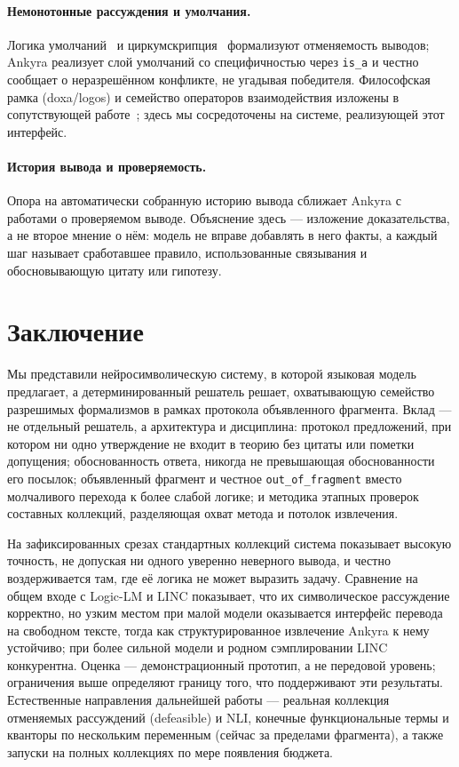 \documentclass[11pt,a4paper]{article}
\begin{document}
\paragraph{Немонотонные рассуждения и умолчания.} Логика умолчаний~\cite{reiter} и
циркумскрипция~\cite{mccarthy} формализуют отменяемость выводов; Ankyra реализует слой умолчаний со
специфичностью через \texttt{is\_a} и честно сообщает о неразрешённом конфликте, не угадывая победителя.
Философская рамка (doxa/logos) и семейство операторов взаимодействия изложены в сопутствующей работе~\cite{doxa};
здесь мы сосредоточены на системе, реализующей этот интерфейс.

\paragraph{История вывода и проверяемость.} Опора на автоматически собранную историю вывода сближает
Ankyra с работами о проверяемом выводе. Объяснение здесь — изложение доказательства, а не второе мнение
о нём: модель не вправе добавлять в него факты, а каждый шаг называет сработавшее правило, использованные
связывания и обосновывающую цитату или гипотезу.

\section{Заключение}

Мы представили нейросимволическую систему, в которой языковая модель предлагает, а детерминированный
решатель решает, охватывающую семейство разрешимых формализмов в рамках протокола объявленного фрагмента.
Вклад — не отдельный решатель, а архитектура и дисциплина: протокол предложений, при котором ни одно
утверждение не входит в теорию без цитаты или пометки допущения; обоснованность ответа, никогда не
превышающая обоснованности его посылок; объявленный фрагмент и честное \texttt{out\_of\_fragment}
вместо молчаливого перехода к более слабой логике; и методика этапных проверок составных коллекций,
разделяющая охват метода и потолок извлечения.

На зафиксированных срезах стандартных коллекций система показывает высокую точность, не допуская ни
одного уверенно неверного вывода, и честно воздерживается там, где её логика не может выразить задачу.
Сравнение на общем входе с Logic-LM и LINC показывает, что их символическое рассуждение корректно, но узким
местом при малой модели оказывается интерфейс перевода на свободном тексте, тогда как структурированное
извлечение Ankyra к нему устойчиво; при более сильной модели и родном сэмплировании LINC конкурентна.
Оценка — демонстрационный прототип, а не передовой уровень; ограничения выше определяют границу того,
что поддерживают эти результаты. Естественные направления дальнейшей работы — реальная коллекция
отменяемых рассуждений (defeasible) и NLI, конечные функциональные термы и кванторы по нескольким
переменным (сейчас за пределами фрагмента), а также запуски на полных коллекциях по мере
появления бюджета.
\end{document}
